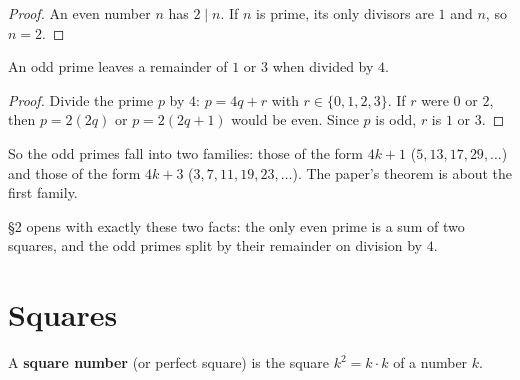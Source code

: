 \bpush\begin{proof}

An even number \(n\) has \(2 \mid n\). If \(n\) is prime, its only
divisors are \(1\) and \(n\), so \(n = 2\).

\end{proof}\bpop

\bpush\begin{btheorem}\label{thm-odd-prime-mod-4}

An odd prime leaves a remainder of \(1\) or \(3\) when divided by \(4\).

\end{btheorem}\bpop

\bpush\begin{proof}

Divide the prime \(p\) by \(4\): \(p = 4q + r\) with
\(r \in \{0, 1, 2, 3\}\). If \(r\) were \(0\) or \(2\), then
\(p = 2(2q)\) or \(p = 2(2q + 1)\) would be even. Since \(p\) is odd,
\(r\) is \(1\) or \(3\).

\end{proof}\bpop

So the odd primes fall into two families: those of the form \(4k + 1\)
(\(5, 13, 17, 29, \dots\)) and those of the form \(4k + 3\)
(\(3, 7, 11, 19, 23, \dots\)). The paper's theorem is about the first
family.

\bpush\begin{binpaper}

§2 opens with exactly these two facts: the only even prime is a sum of
two squares, and the odd primes split by their remainder on division by
\(4\).

\end{binpaper}\bpop

\hypertarget{squares}{%
\section{Squares}\label{squares}}

\bpush\begin{bdefinition}\label{def-square}


A \textbf{square number} (or perfect square) is the square
\(k^2 = k \cdot k\) of a number \(k\).

\end{bdefinition}\bpop

